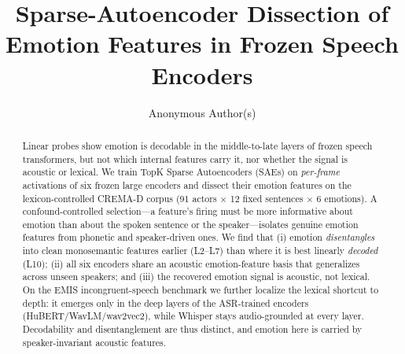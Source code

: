 \documentclass[sigconf,anonymous,nonacm]{acmart}
\begin{document}
\title{Sparse-Autoencoder Dissection of Emotion Features in Frozen Speech Encoders}

\author{Anonymous Author(s)}
\renewcommand{\shortauthors}{Anonymous}

\begin{abstract}
Linear probes show emotion is decodable in the middle-to-late layers of frozen speech transformers, but not which internal features carry it, nor whether the signal is acoustic or lexical. We train TopK Sparse Autoencoders (SAEs) on \emph{per-frame} activations of six frozen large encoders and dissect their emotion features on the lexicon-controlled CREMA-D corpus (91 actors $\times$ 12 fixed sentences $\times$ 6 emotions). A confound-controlled selection---a feature's firing must be more informative about emotion than about the spoken sentence or the speaker---isolates genuine emotion features from phonetic and speaker-driven ones. We find that (i) emotion \emph{disentangles} into clean monosemantic features earlier (L2--L7) than where it is best linearly \emph{decoded} (L10); (ii) all six encoders share an acoustic emotion-feature basis that generalizes across unseen speakers; and (iii) the recovered emotion signal is acoustic, not lexical. On the EMIS incongruent-speech benchmark we further localize the lexical shortcut to depth: it emerges only in the deep layers of the ASR-trained encoders (HuBERT/WavLM/wav2vec2), while Whisper stays audio-grounded at every layer. Decodability and disentanglement are thus distinct, and emotion here is carried by speaker-invariant acoustic features.
\end{abstract}


\maketitle
\end{document}
